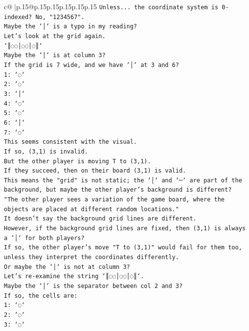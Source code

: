 \documentclass{article}
\begin{document}
{\begin{supertabular}{c@{$\;$}|p{.15\linewidth}@{}p{.15\linewidth}p{.15\linewidth}p{.15\linewidth}p{.15\linewidth}p{.15\linewidth}}
{{{\texttt{Unless... the coordinate system is 0{-}indexed? No, "1234567".} \\
\texttt{Maybe the `│` is a typo in my reading?} \\
\texttt{Let's look at the grid again.} \\
\texttt{`║◌◌│◌◌│◌║`} \\
\texttt{Maybe the `│` is at column 3?} \\
\texttt{If the grid is 7 wide, and we have `│` at 3 and 6?} \\
\texttt{1: `◌`} \\
\texttt{2: `◌`} \\
\texttt{3: `│`} \\
\texttt{4: `◌`} \\
\texttt{5: `◌`} \\
\texttt{6: `│`} \\
\texttt{7: `◌`} \\
\texttt{This seems consistent with the visual.} \\
\texttt{If so, (3,1) is invalid.} \\
\texttt{But the other player is moving T to (3,1).} \\
\texttt{If they succeed, then on their board (3,1) is valid.} \\
\texttt{This means the "grid" is not static; the `│` and `─` are part of the background, but maybe the other player's background is different?} \\
\texttt{"The other player sees a variation of the game board, where the objects are placed at different random locations."} \\
\texttt{It doesn't say the background grid lines are different.} \\
\texttt{However, if the background grid lines are fixed, then (3,1) is always a `│` for both players?} \\
\texttt{If so, the other player's move "T to (3,1)" would fail for them too, unless they interpret the coordinates differently.} \\
\texttt{Or maybe the `│` is not at column 3?} \\
\texttt{Let's re{-}examine the string `║◌◌│◌◌│◌║`.} \\
\texttt{Maybe the `│` is the separator between col 2 and 3?} \\
\texttt{If so, the cells are:} \\
\texttt{1: `◌`} \\
\texttt{2: `◌`} \\
\texttt{3: `◌`} \\
}}}
\end{supertabular}}
\end{document}
